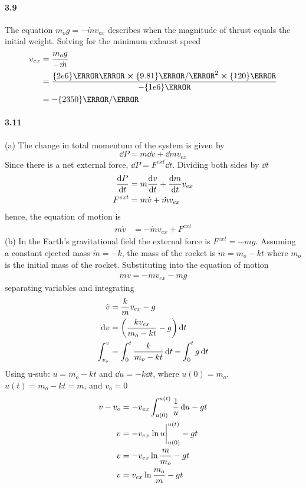 \documentclass[../problems.tex]{subfiles}
\begin{document}
\paragraph{3.9} 

The equation $m_og = -\dot{m}v_{ex}$ describes when the magnitude of thrust equals the initial
weight. Solving for the minimum exhaust speed
\begin{align*}
    v_{ex} &= \frac{m_og}{-\dot{m}} \\
    &= \frac{\qty{2e6}{\kilo\gram}\cp\qty{9.81}{\meter/\second^2}\cp\qty{120}{\s}}
        {-\qty{1e6}{\kg}}\\
    &= -\qty{2350}{\meter/\second}
\end{align*}

\paragraph{3.11}
(a) The change in total momentum of the system is given by
\begin{equation*}
    \tag{3.4}
    \dd{P} = m \dd{v} + \dd{m} v_{ex}
\end{equation*}
Since there is a net external force, $\dd{P} = F^{ext} \dd{t}$. Dividing both sides by $\dd{t}$
\begin{align*}
    \frac{\dd{P}}{\dd{t}} &= m \dv{v}{t} + \dv{m}{t} v_{ex} \\
    F^{ext} &= m \dot{v} + \dot{m} v_{ex}
\end{align*}
hence, the equation of motion is
\begin{align*} \tag{3.29}
    m\dot{v} &= - \dot{m} v_{ex} + F^{ext}
\end{align*}
(b) In the Earth's gravitational field the external force is $F^{ext} = -mg$. Assuming a constant
ejected mass $\dot{m} = -k$, the mass of the rocket is $m = m_o - kt$ where $m_o$ is the initial
mass of the rocket. Substituting into the equation of motion
\begin{align*} \tag{3.30}
    m\dot{v} = -\dot{m} v_{ex} - mg
\end{align*}
separating variables and integrating
\begin{align*}
    \dot{v} &= \frac{k}{m} v_{ex} - g \\
    \dd{v} &= \quantity(\frac{kv_{ex}}{m_o-kt}-g) \dd{t} \\
    \int_{v_o}^{v} &= \int_{0}^{t} \frac{k}{m_o-kt} \dd{t} - \int_{0}^{t} g \dd{t} 
\end{align*}
Using u-sub: $u = m_o - kt$ and $\dd{u} = -k \dd{t}$, where $u(0) = m_o$, $u(t) = m_o - kt = m$, and
$v_o = 0$
\begin{align*}
    v - v_o &= -v_{ex} \int_{u(0)}^{u(t)} \frac{1}{u} \dd{u} - gt \\
    v &= -v_{ex} \eval{\ln{u}}_{u(0)}^{u(t)} - gt \\
    v &= -v_{ex} \ln{\frac{m}{m_o}} - gt \\
    v &= v_{ex} \ln{\frac{m_o}{m}} - gt
\end{align*}
\end{document}
